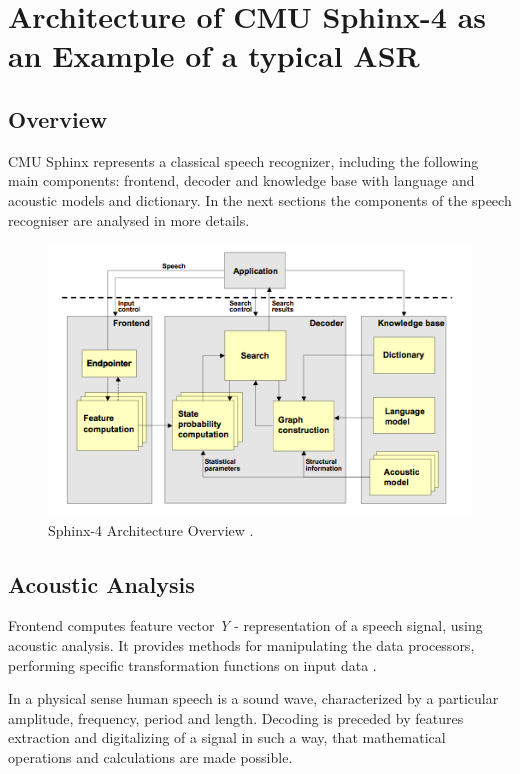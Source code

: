 \chapter{Architecture of CMU Sphinx-4 as an Example of a typical ASR}
\label{chap:sphinx}
 \section {Overview} 
CMU Sphinx represents a classical speech recognizer, including the following
main components: frontend, decoder and knowledge base with language and acoustic
models and dictionary. In the next sections the components of the speech
recogniser are analysed in more details.
 
 \begin{figure}[htbp]
  \centering
    \includegraphics[width=1.0\textwidth]{images/sphinxarch.png}
 \caption{Sphinx-4 Architecture Overview \parencite
 {Lamereetal2013:Eurospeech}.}
  \label{fig:sphinx arh}
\end {figure}

 \section {Acoustic Analysis} 

Frontend computes feature vector \textit {Y } - representation of a speech
signal, using acoustic analysis.  It provides methods for manipulating the data processors, performing
specific transformation functions on input data \parencite{Lamereetal2013:Eurospeech}.

In a physical sense human speech is a sound wave, characterized by a particular amplitude, frequency, period and length.
Decoding is preceded by features extraction and digitalizing of a signal in such a way, that mathematical operations and calculations are made possible. 

